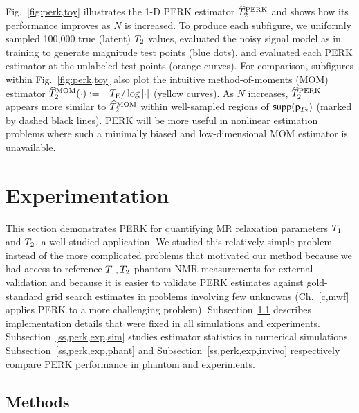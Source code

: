 Fig.~\ref{fig:perk,toy} illustrates the 1-D PERK estimator $\widehat{T}_2^{\mathrm{PERK}}$
and shows how its performance improves
as $N$ is increased. 
To produce each subfigure,
we uniformly sampled 100,000 true (latent) $T_2$ values,
evaluated the noisy signal model as in training
to generate magnitude test points (blue dots),
and evaluated each PERK estimator 
at the unlabeled test points (orange curves).
For comparison,
subfigures within Fig.~\ref{fig:perk,toy} also plot
the intuitive method-of-moments (MOM) estimator
$\TtMOM\paren{\cdot} := -\TE/\log{\abs{\cdot}}$ (yellow curves).
As $N$ increases,
$\widehat{T}_2^{\mathrm{PERK}}$ appears more similar to $\widehat{T}_2^{\mathrm{MOM}}$
within well-sampled regions of $\supp{\dist{\Tt}}$ 
(marked by dashed black lines).
PERK will be more useful
in nonlinear estimation problems
where such a minimally biased 
and low-dimensional MOM estimator is unavailable.

\section{Experimentation}
\label{s,perk,exp}

This section demonstrates PERK 
for quantifying 
MR relaxation parameters $T_1$ and $T_2$,
a well-studied application.
We studied this relatively simple problem 
instead of the more complicated problems
that motivated our method
because we had access 
to reference $T_1,T_2$ phantom NMR measurements \cite{keenan:16:msm}
for external validation
and because it is easier
to validate PERK estimates
against gold-standard grid search estimates
in problems involving few unknowns
(Ch.~\ref{c,mwf} applies PERK
to a more challenging problem).
Subsection~\ref{ss,perk,exp,meth} describes implementation details
that were fixed in all simulations and experiments.
Subsection~\ref{ss,perk,exp,sim} studies estimator statistics
in numerical simulations.
Subsection~\ref{ss,perk,exp,phant} and Subsection~\ref{ss,perk,exp,invivo}
respectively compare PERK performance
in phantom and \invivo experiments.

\subsection{Methods}
\label{ss,perk,exp,meth}

